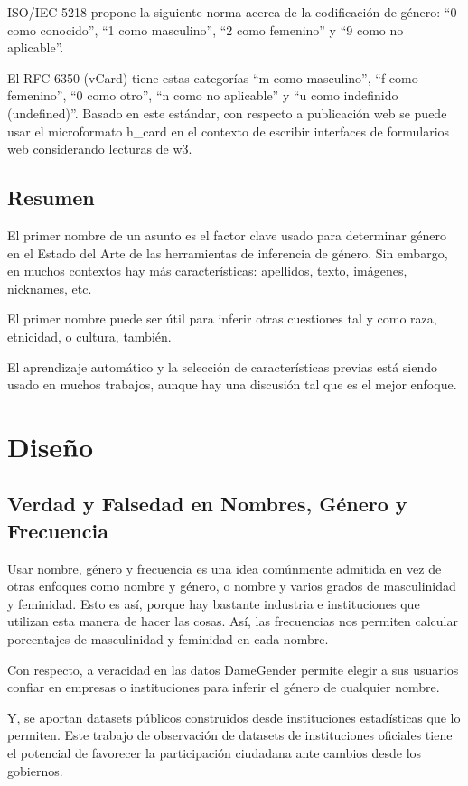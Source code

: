 \documentclass[a4paper]{article}
\begin{document}
ISO/IEC 5218 propone la siguiente norma acerca de la codificación
de género: ``0 como conocido'', ``1 como masculino'', ``2 como femenino''
y ``9 como no aplicable''.

El RFC 6350 (vCard) tiene estas categorías ``m como masculino'',
``f como femenino'', ``0 como otro'', ``n como no aplicable'' y
``u como indefinido (undefined)''. Basado en este estándar, con
respecto a publicación web se puede usar el microformato h_card
en el contexto de escribir interfaces de formularios web considerando
lecturas de w3.

\subsection{Resumen}

El primer nombre de un asunto es el factor clave usado para
determinar género en el Estado del Arte de las herramientas de
inferencia de género. Sin embargo, en muchos contextos hay más
características: apellidos, texto, imágenes, nicknames, etc.

El primer nombre puede ser útil para inferir otras cuestiones
tal y como raza, etnicidad, o cultura, también.

El aprendizaje automático y la selección de características
previas está siendo usado en muchos trabajos, aunque hay una
discusión tal que es el mejor enfoque.

\section{Diseño}

\subsection{Verdad y Falsedad en Nombres, Género y Frecuencia}

Usar nombre, género y frecuencia es una idea comúnmente admitida
en vez de otras enfoques como nombre y género, o nombre y varios
grados de masculinidad y feminidad. Esto es así, porque hay bastante
industria e instituciones que utilizan esta manera de hacer las cosas.
Así, las frecuencias nos permiten calcular porcentajes de masculinidad
y feminidad en cada nombre.

Con respecto, a veracidad en las datos DameGender permite elegir
a sus usuarios confiar en empresas o instituciones para inferir el
género de cualquier nombre.

Y, se aportan datasets públicos construidos desde instituciones
estadísticas que lo permiten. Este trabajo de observación de
datasets de instituciones oficiales tiene el potencial de favorecer
la participación ciudadana ante cambios desde los gobiernos.
\end{document}

